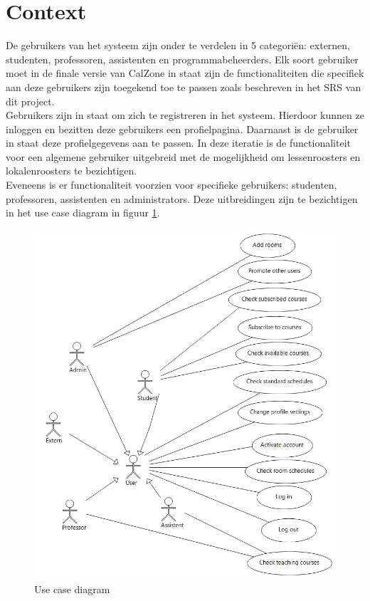 \section{Context}
\label{sec:context}

De gebruikers van het systeem zijn onder te verdelen in 5 categori\"{e}n: externen, studenten, professoren, assistenten en programmabeheerders. 
Elk soort gebruiker moet in de finale versie van CalZone in staat zijn de functionaliteiten die specifiek aan deze gebruikers zijn toegekend toe te passen zoals beschreven in het SRS van dit project. 
\\
Gebruikers zijn in staat om zich te registreren in het systeem. 
Hierdoor kunnen ze inloggen en bezitten deze gebruikers een profielpagina.
Daarnaast is de gebruiker in staat deze profielgegevens aan te passen.
In deze iteratie is de functionaliteit voor een algemene gebruiker uitgebreid met de mogelijkheid om lessenroosters en lokalenroosters te bezichtigen.
\\
Eveneens is er functionaliteit voorzien voor specifieke gebruikers: studenten, professoren, assistenten en administrators.
Deze uitbreidingen zijn te bezichtigen in het use case diagram in figuur \ref{fig:usecase}.

\begin{figure}[H]
	\centering
	\includegraphics[scale=0.5]{img/use_cases}
	\caption{Use case diagram}
	\label{fig:usecase}
\end{figure}